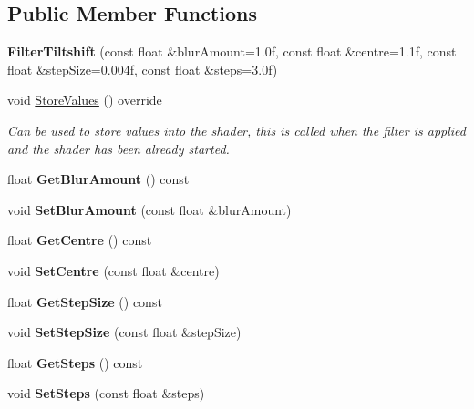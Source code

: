 \subsection*{Public Member Functions}
\begin{DoxyCompactItemize}
\item 
\mbox{\label{class_flounder_1_1_filter_tiltshift_adaf19dd3aee484906d96e69cf139288d}} 
{\bfseries Filter\+Tiltshift} (const float \&blur\+Amount=1.\+0f, const float \&centre=1.\+1f, const float \&step\+Size=0.\+004f, const float \&steps=3.\+0f)
\item 
void \hyperlink{class_flounder_1_1_filter_tiltshift_a0131c0901e648cff5ee3e3239f04e8e5}{Store\+Values} () override
\begin{DoxyCompactList}\small\item\em Can be used to store values into the shader, this is called when the filter is applied and the shader has been already started. \end{DoxyCompactList}\item 
\mbox{\label{class_flounder_1_1_filter_tiltshift_a4bb7e4b8c1b6da8cd83e9b2b0207ac21}} 
float {\bfseries Get\+Blur\+Amount} () const
\item 
\mbox{\label{class_flounder_1_1_filter_tiltshift_a1cb3ac65f3a040fbb1ce86cbd4e4aec9}} 
void {\bfseries Set\+Blur\+Amount} (const float \&blur\+Amount)
\item 
\mbox{\label{class_flounder_1_1_filter_tiltshift_ab765d72f785a46a499f6ab59f297d94c}} 
float {\bfseries Get\+Centre} () const
\item 
\mbox{\label{class_flounder_1_1_filter_tiltshift_afa272fa4f477e7592d1a6d9a054add5d}} 
void {\bfseries Set\+Centre} (const float \&centre)
\item 
\mbox{\label{class_flounder_1_1_filter_tiltshift_a67b5ed0feec5c725bf8035ee5e8d46b9}} 
float {\bfseries Get\+Step\+Size} () const
\item 
\mbox{\label{class_flounder_1_1_filter_tiltshift_ae28082893b4650575eb2e5171568092f}} 
void {\bfseries Set\+Step\+Size} (const float \&step\+Size)
\item 
\mbox{\label{class_flounder_1_1_filter_tiltshift_a8be595c71d1a100ca04399c011b9d954}} 
float {\bfseries Get\+Steps} () const
\item 
\mbox{\label{class_flounder_1_1_filter_tiltshift_a6cc019113c3b176c44f123a4ee948037}} 
void {\bfseries Set\+Steps} (const float \&steps)
\end{DoxyCompactItemize}
